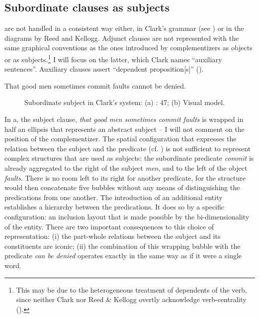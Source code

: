 \documentclass[output=paper]{langsci/langscibook}
\begin{document}
\subsection{Subordinate clauses as subjects}\label{sec:4:4.3}

 are not handled in a consistent way either, in Clark’s grammar  (see \citealt[319--322 and 328--329]{mazziotta_drawing_2016}) or in the diagrams by Reed and Kellogg. Adjunct clauses are not represented with the same graphical conventions as the ones introduced by complementizers as objects or as subjects.\footnote{ \textrm{This may be due to the heterogeneous treatment of dependents of the verb, since neither Clark nor Reed \& Kellogg overtly acknowledge verb-centrality ().}} I will focus on the latter, which Clark names “auxiliary sentences”. Auxiliary clauses assert “dependent proposition[s]” (\citeyear[187]{clark_normal_1870}).

\ea \label{ex:4:4} That good men sometimes commit faults cannot be denied. \z

\begin{figure}
    \caption{Subordinate subject in Clark’s system: (a) \citeyear{clark_normal_1870}: 47; (b) Visual model.\label{fig:4:9}}
\end{figure}
 

In a, the subject clause, \textit{that good men sometimes commit faults} is wrapped in half an ellipsis that represents an abstract subject – I will not comment on the position of the complementizer. The spatial configuration that expresses the relation between the subject and the predicate (cf. ) is not sufficient to represent complex structures that are used as subjects: the subordinate predicate \textit{commit} is already aggregated to the right of the subject \textit{men}, and to the left of the object \textit{faults}. There is no room left to its right for another predicate, for the structure would then concatenate five bubbles without any means of distinguishing the predications from one another. The introduction of an additional entity establishes a hierarchy between the predications. It does so by a specific configuration: an inclusion layout that is made possible by the bi-dimensionality of the entity. There are two important consequences to this choice of representation: (i) the part-whole relations between the subject and its constituents are iconic; (ii) the combination of this wrapping bubble with the predicate \textit{can be denied} operates exactly in the same way as if it were a single word.
\end{document}
